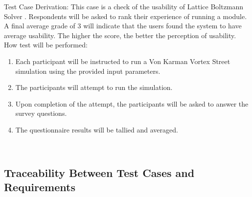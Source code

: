 \documentclass[12pt, titlepage]{article}
\newcommand{\famname}{Lattice Boltzmann Solver}
\begin{document}
\begin{enumerate}
Test Case Derivation: This case is a check of the usability of {\famname} . Respondents will be asked to rank their experience of running a module. A final average grade of 3 will indicate that the users found the system to have average usability. The higher the score, the better the perception of usability.\\
	
How test will be performed: 

\begin{enumerate}
\item Each participant will be instructed to run a Von Karman Vortex Street simulation using the provided input parameters.
\item The participants will attempt to run the simulation.
\item Upon completion of the attempt, the participants will be asked to answer the survey questions.
\item The questionnaire results will be tallied and averaged.
\end{enumerate}

\end{enumerate}

~\newpage
\subsection{Traceability Between Test Cases and Requirements}
\end{document}
